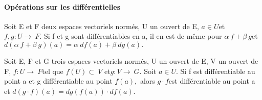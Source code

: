 \paragraph{Opérations sur les différentielles}
%
\begin{prop}
  Soit E et F deux espaces vectoriels normés, U un
  ouvert de E, $a \in U $et $f,g : U \rightarrow~ F.$ Si f et g sont différentiables en a,
  il en est de même pour $\alpha~f + \beta~g $et $d(\alpha~f + \beta~g)(a) =
  \alpha~df(a) + \beta~dg(a).$
%
\end{prop}
%
\begin{thm}
  Soit E, F et G trois espaces vectoriels normés, U un
  ouvert de E, V un ouvert de F, $f : U \rightarrow~ F $tel que $f(U) \subset~ V $
  et$ g : V \rightarrow~ G.$
  Soit $a \in U.$ Si f est différentiable au point a et g différentiable au
  point $f(a),$ alors $g \cdot f $est différentiable au point a et $d(g \cdot
  f)(a) =
  dg\left (f(a)\right ) \cdot df(a).$
\end{thm}
%
%
%
%
%
%
%
%
